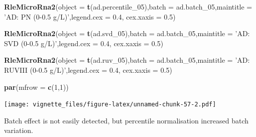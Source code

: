 \documentclass[]{book}
\newenvironment{Shaded}{\begin{snugshade}}{\end{snugshade}}
\newcommand{\KeywordTok}[1]{\textcolor[rgb]{0.13,0.29,0.53}{\textbf{#1}}}
\newcommand{\DataTypeTok}[1]{\textcolor[rgb]{0.13,0.29,0.53}{#1}}
\newcommand{\DecValTok}[1]{\textcolor[rgb]{0.00,0.00,0.81}{#1}}
\newcommand{\FloatTok}[1]{\textcolor[rgb]{0.00,0.00,0.81}{#1}}
\newcommand{\StringTok}[1]{\textcolor[rgb]{0.31,0.60,0.02}{#1}}
\newcommand{\NormalTok}[1]{#1}
\begin{document}
\begin{Shaded}
\begin{Highlighting}[]
\KeywordTok{RleMicroRna2}\NormalTok{(}\DataTypeTok{object =} \KeywordTok{t}\NormalTok{(ad.percentile_}\DecValTok{05}\NormalTok{),}\DataTypeTok{batch =}\NormalTok{ ad.batch_}\DecValTok{05}\NormalTok{,}\DataTypeTok{maintitle =} \StringTok{'AD: PN (0-0.5 g/L)'}\NormalTok{,}\DataTypeTok{legend.cex =} \FloatTok{0.4}\NormalTok{, }\DataTypeTok{cex.xaxis =} \FloatTok{0.5}\NormalTok{)}

\KeywordTok{RleMicroRna2}\NormalTok{(}\DataTypeTok{object =} \KeywordTok{t}\NormalTok{(ad.svd_}\DecValTok{05}\NormalTok{),}\DataTypeTok{batch =}\NormalTok{ ad.batch_}\DecValTok{05}\NormalTok{,}\DataTypeTok{maintitle =} \StringTok{'AD: SVD (0-0.5 g/L)'}\NormalTok{,}\DataTypeTok{legend.cex =} \FloatTok{0.4}\NormalTok{, }\DataTypeTok{cex.xaxis =} \FloatTok{0.5}\NormalTok{)}

\KeywordTok{RleMicroRna2}\NormalTok{(}\DataTypeTok{object =} \KeywordTok{t}\NormalTok{(ad.ruv_}\DecValTok{05}\NormalTok{),}\DataTypeTok{batch =}\NormalTok{ ad.batch_}\DecValTok{05}\NormalTok{,}\DataTypeTok{maintitle =} \StringTok{'AD: RUVIII (0-0.5 g/L)'}\NormalTok{,}\DataTypeTok{legend.cex =} \FloatTok{0.4}\NormalTok{, }\DataTypeTok{cex.xaxis =} \FloatTok{0.5}\NormalTok{)}

\KeywordTok{par}\NormalTok{(}\DataTypeTok{mfrow =} \KeywordTok{c}\NormalTok{(}\DecValTok{1}\NormalTok{,}\DecValTok{1}\NormalTok{))}
\end{Highlighting}
\end{Shaded}

\texttt{[image: vignette\_files/figure-latex/unnamed-chunk-57-2.pdf]}

Batch effect is not easily detected, but percentile normalisation
increased batch variation.
\end{document}
